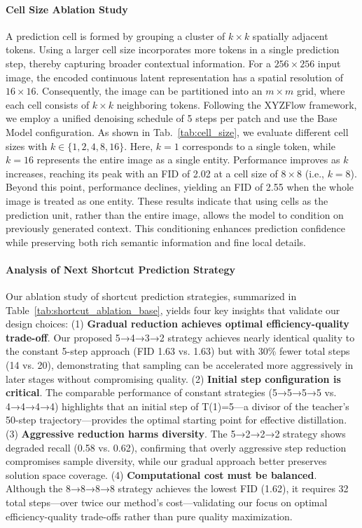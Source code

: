 \documentclass{article}
\theoremstyle{plain}
\theoremstyle{definition}
\theoremstyle{remark}
\begin{document}
\vspace{-4mm}
\paragraph{Cell Size Ablation Study}
A prediction cell is formed by grouping a cluster of $k \times k$ spatially adjacent tokens. Using a larger cell size incorporates more tokens in a single prediction step, thereby capturing broader contextual information. For a $256 \times 256$ input image, the encoded continuous latent representation has a spatial resolution of $16 \times 16$. Consequently, the image can be partitioned into an $m \times m$ grid, where each cell consists of $k \times k$ neighboring tokens. Following the XYZFlow framework, we employ a unified denoising schedule of 5 steps per patch and use the Base Model configuration. As shown in Tab.~\ref{tab:cell_size}, we evaluate different cell sizes with $k \in \{1, 2, 4, 8, 16\}$. Here, $k = 1$ corresponds to a single token, while $k = 16$ represents the entire image as a single entity. Performance improves as $k$ increases, reaching its peak with an FID of 2.02 at a cell size of $8 \times 8$ (i.e., $k = 8$). Beyond this point, performance declines, yielding an FID of 2.55 when the whole image is treated as one entity. These results indicate that using cells as the prediction unit, rather than the entire image, allows the model to condition on previously generated context. This conditioning enhances prediction confidence while preserving both rich semantic information and fine local details.

\vspace{-3.5mm}
\paragraph{Analysis of Next Shortcut Prediction Strategy}

Our ablation study of shortcut prediction strategies, summarized in Table~\ref{tab:shortcut_ablation_base}, yields four key insights that validate our design choices: (1) \textbf{Gradual reduction achieves optimal efficiency-quality trade-off}. Our proposed 5→4→3→2 strategy achieves nearly identical quality to the constant 5-step approach (FID 1.63 vs. 1.63) but with 30\% fewer total steps (14 vs. 20), demonstrating that sampling can be accelerated more aggressively in later stages without compromising quality. (2) \textbf{Initial step configuration is critical}. The comparable performance of constant strategies (5→5→5→5 vs. 4→4→4→4) highlights that an initial step of T(1)=5—a divisor of the teacher's 50-step trajectory—provides the optimal starting point for effective distillation. (3) \textbf{Aggressive reduction harms diversity}. The 5→2→2→2 strategy shows degraded recall (0.58 vs. 0.62), confirming that overly aggressive step reduction compromises sample diversity, while our gradual approach better preserves solution space coverage. (4) \textbf{Computational cost must be balanced}. Although the 8→8→8→8 strategy achieves the lowest FID (1.62), it requires 32 total steps—over twice our method's cost—validating our focus on optimal efficiency-quality trade-offs rather than pure quality maximization.
\end{document}
